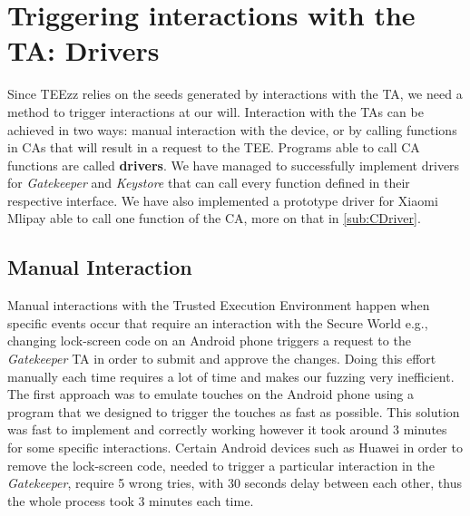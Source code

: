\documentclass[a4paper,11pt,oneside]{article}
\newcommand{\sysname}{TEEzz\xspace}
\begin{document}
\section{Triggering interactions with the TA: Drivers}
Since \sysname relies on the seeds generated by interactions
with the TA, we need a method to trigger interactions at our will.
Interaction with the TAs can be achieved in two ways:
manual interaction with the device, or by calling functions in CAs that will result in a request to the TEE. Programs able to call CA functions are called \textbf{drivers}. We have managed to successfully implement drivers for \emph{Gatekeeper} and \emph{Keystore} that can call every function defined in their respective interface.
We have also implemented a prototype driver for Xiaomi Mlipay able to call one function of the CA, more on that in \autoref{sub:CDriver}.
\subsection{Manual Interaction}
Manual interactions with the Trusted Execution Environment happen when
specific events occur that require an interaction with the Secure World e.g., changing lock-screen code on an Android phone triggers a request
to the \emph{Gatekeeper} TA in order to submit and approve the changes. Doing this effort
manually each time requires a lot of time and makes our fuzzing very inefficient.
The first approach was to emulate touches on the Android phone using a
program that we designed to trigger the touches as fast as possible.
This solution was fast to implement and correctly working however it
took around 3 minutes for some specific interactions.
Certain Android devices such as Huawei in order to
remove the lock-screen code, needed to trigger a particular interaction in the
\emph{Gatekeeper}, require 5 wrong tries, with 30 seconds delay between
each other, thus the whole process took 3 minutes each time.
\end{document}
